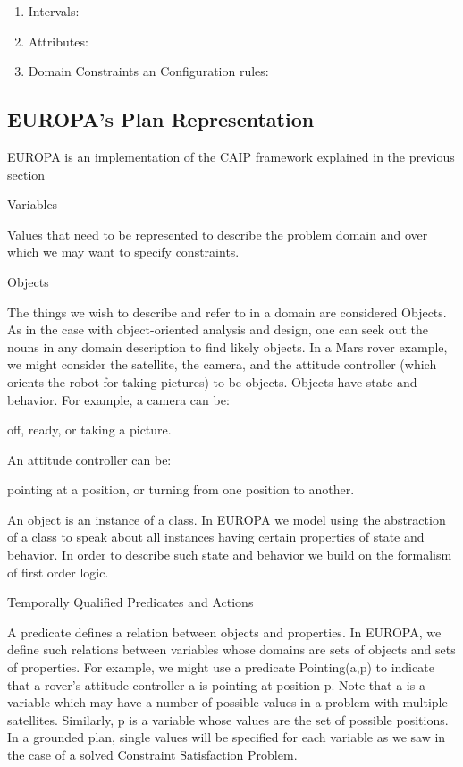 \begin{enumerate}
	\item Intervals: 
	\item Attributes:
	\item Domain Constraints an Configuration rules:
\end{enumerate}


\subsection{EUROPA's Plan Representation}
\label{sec:europa:pr}


EUROPA is an implementation of the CAIP framework explained in the previous section



Variables

Values that need to be represented to describe the problem domain and over which we may want to specify constraints.

Objects

The things we wish to describe and refer to in a domain are considered Objects. As in the case with object-oriented analysis and design, one can seek out the nouns in any domain description to find likely objects. In a Mars rover example, we might consider the satellite, the camera, and the attitude controller (which orients the robot for taking pictures) to be objects. Objects have state and behavior. For example, a camera can be:

    off,
    ready, or
    taking a picture. 

An attitude controller can be:

    pointing at a position, or
    turning from one position to another. 

An object is an instance of a class. In EUROPA we model using the abstraction of a class to speak about all instances having certain properties of state and behavior. In order to describe such state and behavior we build on the formalism of first order logic.


Temporally Qualified Predicates and Actions

A predicate defines a relation between objects and properties. In EUROPA, we define such relations between variables whose domains are sets of objects and sets of properties. For example, we might use a predicate Pointing(a,p) to indicate that a rover's attitude controller a is pointing at position p. Note that a is a variable which may have a number of possible values in a problem with multiple satellites. Similarly, p is a variable whose values are the set of possible positions. In a grounded plan, single values will be specified for each variable as we saw in the case of a solved Constraint Satisfaction Problem.

